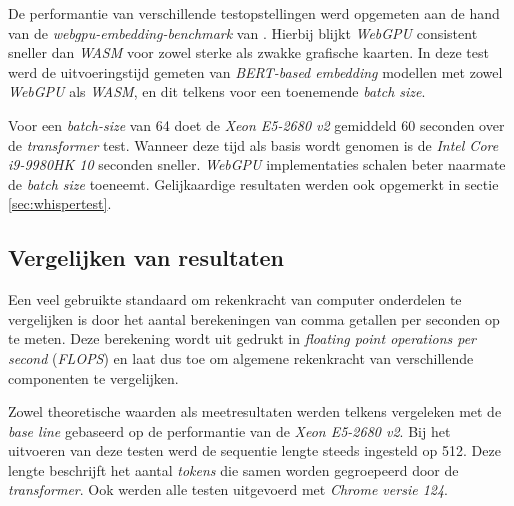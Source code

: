 De performantie van verschillende testopstellingen werd opgemeten aan de hand van de \textit{webgpu-embedding-benchmark} van \textcite{Lochner2024}. Hierbij blijkt \textit{WebGPU} consistent sneller dan \textit{WASM} voor zowel sterke als zwakke grafische kaarten. In deze test werd de uitvoeringstijd gemeten van \textit{BERT-based embedding} modellen met zowel \textit{WebGPU} als \textit{WASM}, en dit telkens voor een toenemende \textit{batch size}.

\bigbreak{}

Voor een \textit{batch-size} van 64 doet de \textit{Xeon E5-2680 v2} gemiddeld 60 seconden over de \textit{transformer} test. Wanneer deze tijd als basis wordt genomen is de \textit{Intel Core i9-9980HK 10} seconden sneller. \textit{WebGPU} implementaties schalen beter naarmate de \textit{batch size} toeneemt. Gelijkaardige resultaten werden ook opgemerkt in sectie \ref{sec:whispertest}.

\subsection{Vergelijken van resultaten}

Een veel gebruikte standaard om rekenkracht van computer onderdelen te vergelijken is door het aantal berekeningen van comma getallen per seconden op te meten. Deze berekening wordt uit gedrukt in \emph{floating point operations per second} (\textit{FLOPS}) en laat dus toe om algemene rekenkracht van verschillende componenten te vergelijken. 

\bigbreak{}

Zowel theoretische waarden als meetresultaten werden telkens vergeleken met de \textit{base line} gebaseerd op de performantie van de \textit{Xeon E5-2680 v2}. Bij het uitvoeren van deze testen werd de sequentie lengte steeds ingesteld op 512. Deze lengte beschrijft het aantal \textit{tokens} die samen worden gegroepeerd door de \textit{transformer}. Ook werden alle testen uitgevoerd met \emph{Chrome versie 124}.

\break{}

